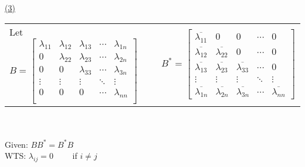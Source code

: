 \documentclass[12pt]{article}
\begin{document}
\hyperlink{toc}{\hypertarget{1.3}{(3)}}\\
\begin{tabularx}{\textwidth}{>{\centering\arraybackslash}X  >{\centering\arraybackslash}X}

	Let $B = \begin{bmatrix}
			\lambda_{11} & \lambda_{12} & \lambda_{13} & \cdots & \lambda_{1n} \\[1.7mm]
			0            & \lambda_{22} & \lambda_{23} & \cdots & \lambda_{2n} \\[1.7mm]
			0            & 0            & \lambda_{33} & \cdots & \lambda_{3n} \\
			\vdots       & \vdots       & \vdots       & \ddots & \vdots       \\[1.7mm]
			0            & 0            & 0            & \cdots & \lambda_{nn} \\
		\end{bmatrix} $ & $B^* = \begin{bmatrix}
			\overline{\lambda_{11}} & 0                       & 0                       & \cdots & 0                       \\[1.7mm]
			\overline{\lambda_{12}} & \overline{\lambda_{22}} & 0                       & \cdots & 0                       \\[1.7mm]
			\overline{\lambda_{13}} & \overline{\lambda_{23}} & \overline{\lambda_{33}} & \cdots & 0                       \\
			\vdots                  & \vdots                  & \vdots                  & \ddots & \vdots                  \\[1.7mm]
			\overline{\lambda_{1n}} & \overline{\lambda_{2n}} & \overline{\lambda_{3n}} & \cdots & \overline{\lambda_{nn}}
		\end{bmatrix} $
\end{tabularx}
\\\\
Given: $BB^* = B^*B$ \\
WTS: $\lambda_{ij} = 0 \qquad $ if $i \not = j$
\\\\
\end{document}
